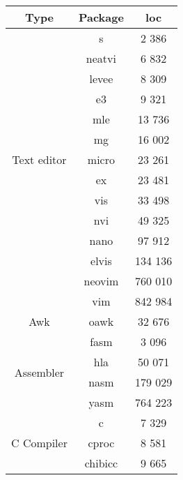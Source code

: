 \begin{table}[!ht]
    \centering
    \begin{tabular}{|c|c|c|}
        \hline
        Type & Package & \gls{loc} \\
        \hline
        \hline
        \multirow{13}{*}{Text editor}
        & s \cite{s} & 2 386 \\
        \cline{2-3}
        & neatvi \cite{neatvi} & 6 832 \\
        \cline{2-3}
        & levee \cite{levee} \footnotemark[4] & 8 309 \\
        \cline{2-3}
        & e3 \cite{e3-editor} & 9 321 \\ %
        \cline{2-3}
        & mle \cite{mle} & 13 736 \\
        \cline{2-3}
        & mg \cite{mg} & 16 002 \\
        \cline{2-3}
        & micro \cite{micro} & 23 261 \\ %
        \cline{2-3}
        & ex \cite{ex-vi} \footnotemark[5] & 23 481 \\
        \cline{2-3}
        & vis \cite{vis} & 33 498 \\ %
        \cline{2-3}
        & nvi \cite{nvi} \footnotemark[5] & 49 325 \\
        \cline{2-3}
        & nano \cite{nano} & 97 912 \\
        \cline{2-3}
        & elvis \cite{elvis} & 134 136 \\
        \cline{2-3}
        & neovim \cite{neovim} & 760 010 \\
        \cline{2-3}
        & vim \cite{vim} & 842 984 \\
        \hline
        \hline
        Awk & oawk \cite{oawk} & 32 676 \\
        \hline
        \hline
        \multirow{4}{*}{Assembler}
        & fasm \cite{fasm} & 3 096 \\ %
        \cline{2-3}
        & hla \cite{hla} & 50 071 \\
        \cline{2-3}
        & nasm \cite{nasm} & 179 029 \\
        \cline{2-3}
        & yasm \cite{yasm} & 764 223 \\ %
        \hline
        \hline
        \multirow{9}{*}{C Compiler}
        & c \cite{c} & 7 329 \\
        \cline{2-3}
        & cproc \cite{cproc} & 8 581 \\
        \cline{2-3}
        & chibicc \cite{chibicc} & 9 665 \\

\end{tabular}
\end{table}
